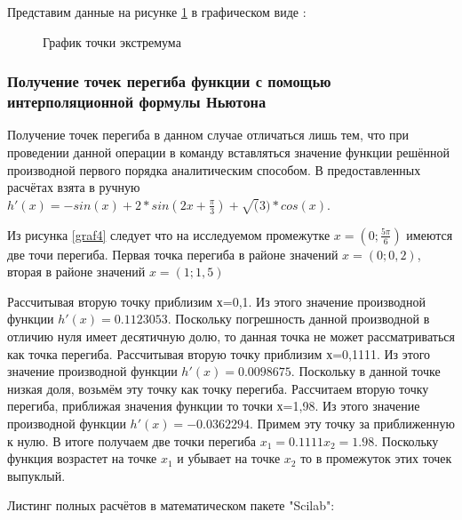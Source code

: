 \documentclass[russian,utf8,nocolumnxxxi,nocolumnxxxii]{eskdtext}
\begin{document}
Представим данные на рисунке \ref{graf5} в графическом виде :
\vspace{0.5cm}
\begin{figure}[h]
\begin{center}
\vspace{1cm}
\caption{График точки экстремума}\label{graf5}
\end{center}
\end{figure}

\subsubsection{Получение точек перегиба функции с помощью интерполяционной формулы Ньютона}
Получение точек перегиба в данном случае отличаться лишь тем, что при проведении данной операции в команду вставляться значение функции решённой производной первого порядка аналитическим способом. В предоставленных расчётах взята в ручную $h'(x)=-sin(x)+2*sin(2x + \frac{\pi}{3}) + \sqrt(3)*cos(x)$.

Из рисунка \ref{graf4} следует что на исследуемом промежутке $x=(0;\frac{5\pi}{6})$ имеются две точи перегиба. Первая точка перегиба в районе значений $x=(0;0,2)$, вторая в районе значений $x=(1;1,5)$

Рассчитывая вторую точку приблизим х=0,1. Из этого значение производной функции $h'(x)=0.1123053$. Поскольку погрешность данной производной в отличию нуля имеет десятичную долю, то данная точка не может рассматриваться как точка перегиба. Рассчитывая вторую точку приблизим х=0,1111. Из этого значение производной функции $h'(x)=0.0098675$. Поскольку в данной точке низкая доля, возьмём эту точку как точку перегиба. Рассчитаем вторую точку перегиба, приближая значения функции то точки х=1,98. Из этого значение производной функции $h'(x)=- 0.0362294$. Примем эту точку за приближенную к нулю. В итоге получаем две точки перегиба $x_1=0.1111 x_2=1.98$. Поскольку функция возрастет на точке $x_1$ и убывает на точке $x_2$ то в промежуток этих точек выпуклый.

Листинг полных расчётов в математическом пакете "Scilab":\\
\end{document}
